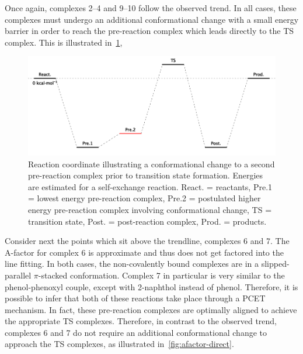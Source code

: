 Once again, complexes 2--4 and 9--10 follow the observed trend. In all cases, these complexes must undergo an additional conformational change with a small energy barrier in order to reach the pre-reaction complex which leads directly to the TS complex. This is illustrated in~\ref{fig:afactor-trend},

\begin{figure}[!htbp]
  \centering
  \includegraphics[width=\textwidth]{figures/afactor-trend.png}
  \caption[Reaction coordinate illustrating a conformational change to a second pre-reaction complex prior to transition state formation.]{Reaction coordinate illustrating a conformational change to a second pre-reaction complex prior to transition state formation. Energies are estimated for a self-exchange reaction. React. = reactants, Pre.1 = lowest energy pre-reaction complex, Pre.2 = postulated higher energy pre-reaction complex involving conformational change, TS = transition state, Post. = post-reaction complex, Prod. = products.}
\label{fig:afactor-trend}
\end{figure}

Consider next the points which sit above the trendline, complexes 6 and 7. The A-factor for complex 6 is approximate and thus does not get factored into the line fitting. In both cases, the non-covalently bound complexes are in a slipped-parallel $\pi$-stacked conformation. Complex 7 in particular is very similar to the phenol-phenoxyl couple, except with 2-naphthol instead of phenol. Therefore, it is possible to infer that both of these reactions take place through a PCET mechanism. In fact, these pre-reaction complexes are optimally aligned to achieve the appropriate TS complexes. Therefore, in contrast to the observed trend, complexes 6 and 7 do not require an additional conformational change to approach the TS complexes, as illustrated in~\ref{fig:afactor-direct}.

